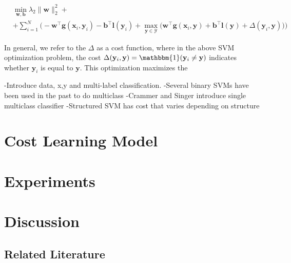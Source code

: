 \documentclass{article} %
\begin{document}
\begin{equation}
\begin{split}
\label{objective}
& \min_{\mathbf{w}, \mathbf{b}} \lambda_2\|\mathbf{w}\|_2^2+ \\
 & +\sum_{i=1}^N\bigg(-\mathbf{w}^\top \mathbf{g}(\mathbf{x}_i,\mathbf{y}_i)-\mathbf{b}^\top \mathbf{l}(\mathbf{y}_i)+\max_{\mathbf{y}\in \mathcal{Y}}\Big(\mathbf{w}^\top\mathbf{g}(\mathbf{x}_i,\mathbf{y})+\mathbf{b}^\top \mathbf{l}(\mathbf{y})+\Delta(\mathbf{y}_i,\mathbf{y})\Big)\bigg)
\end{split}
\end{equation}

In general, we refer to the $\Delta$ as a cost function, where in the above SVM optimization problem, the cost 
$\Delta(\mathbf{y}_i,\mathbf{y})=\mathbbm{1}(\mathbf{y}_i\neq\mathbf{y})$ 
indicates whether $\mathbf{y}_i$ is equal to $\mathbf{y}$.  This optimization
maximizes the 
 

-Introduce data, x,y and multi-label classification.
-Several binary SVMs have been used in the past to do multiclass
-Crammer and Singer introduce single multiclass classifier
-Structured SVM has cost that varies depending on structure



\section{Cost Learning Model}


\section{Experiments}

\section{Discussion}

\subsection{Related Literature}

\end{document}
